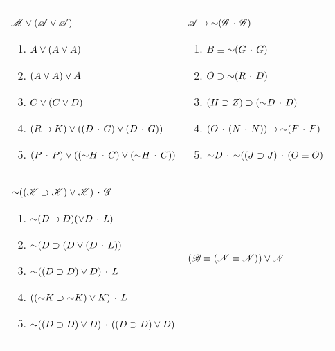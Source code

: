 \begin{exercises}
\begin{longtabu}{p{2.5in}p{2.5in}}
\item $ \mathscr{M} \vee (\mathscr{A} \vee \mathscr{A}) $ 
\begin{flushleft} 	
\begin{enumerate}[label=\alph*.]
\item 	$ A \vee (A \vee A) 			$
\item 	$ (A \vee A) \vee A			$
\item 	$ C \vee (C \vee D)			$
\item 	$ (R \supset K) \vee ((D \,\cdot\, G) \vee (D \,\cdot\, G)) 			$
\item 	$ (P \,\cdot\, P)  \vee ((\mathord{\sim} H \,\cdot\, C) \vee (\mathord{\sim} H \,\cdot\, C)) 			$
\end{enumerate}
\end{flushleft}
&
\item $ \mathscr{A} \supset \mathord{\sim} (\mathscr{G} \,\cdot\, \mathscr{G}) $ 
\begin{flushleft} 	
\begin{enumerate}[label=\alph*.]
\item 	$B \equiv \mathord{\sim} (G \,\cdot\, G) 			$
\item 	$O \supset \mathord{\sim} (R \,\cdot\, D) 			$
\item 	$(H \supset Z) \supset (\mathord{\sim} D	\,\cdot\, D)		$
\item 	$ (O \,\cdot\, (N \,\cdot\, N))  \supset \mathord{\sim} (F \,\cdot\, F)			$
\item 	$\mathord{\sim} D \,\cdot\, \mathord{\sim}( (J \supset J) \,\cdot\, (O \equiv O) $ 
\end{enumerate}
\end{flushleft}
\\
\item $ \mathord{\sim} ((\mathscr{K} \supset \mathscr{K}) \vee \mathscr{K}) \,\cdot\, \mathscr{G} $ 
\begin{flushleft} 	
\begin{enumerate}[label=\alph*.]
\item 	$\mathord{\sim} (D \supset D) (\vee D \,\cdot\, L)	 			$
\item 	$ \mathord{\sim} (D \supset (D \vee (D \,\cdot\, L))				$
\item 	$ \mathord{\sim} ((D \supset D) \vee D) \,\cdot\, L			$
\item 	$((\mathord{\sim} K \supset \mathord{\sim} K) \vee K) \,\cdot\, L 			$
\item 	$ \mathord{\sim} ((D \supset D) \vee D) \,\cdot\, ((D \supset D) \vee D)			$
\end{enumerate}
\end{flushleft}
&
\item $ (\mathscr{B} \equiv (\mathscr{N} \equiv \mathscr{N})) \vee \mathscr{N} $ 
\begin{flushleft} 	

\end{flushleft}
\end{longtabu}
\end{exercises}
